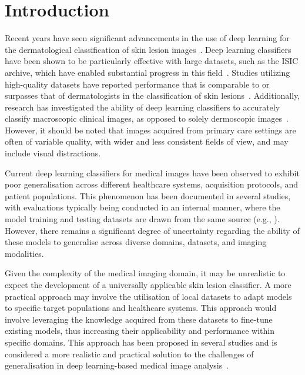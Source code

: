 \section{Introduction}
\label{sec:generalisation_intro}
Recent years have seen significant advancements in the use of deep learning for the dermatological classification of skin lesion images~\citep{du2020ai,wu2022skin}. Deep learning classifiers have been shown to be particularly effective with large datasets, such as the ISIC archive, which have enabled substantial progress in this field~\citep{tschandl2018ham10000,wen2021characteristics}. Studies utilizing high-quality datasets have reported performance that is comparable to or surpasses that of dermatologists in the classification of skin lesions~\citep{esteva2017dermatologist,haenssle2018man,han2018classification,tschandl2019expert}. Additionally, research has investigated the ability of deep learning classifiers to accurately classify macroscopic clinical images, as opposed to solely dermoscopic images~\citep{fujisawa2019deep}. However, it should be noted that images acquired from primary care settings are often of variable quality, with wider and less consistent fields of view, and may include visual distractions.

Current deep learning classifiers for medical images have been observed to exhibit poor generalisation across different healthcare systems, acquisition protocols, and patient populations. This phenomenon has been documented in several studies, with evaluations typically being conducted in an internal manner, where the model training and testing datasets are drawn from the same source (e.g., \cite{han2018classification}). However, there remains a significant degree of uncertainty regarding the ability of these models to generalise across diverse domains, datasets, and imaging modalities. 

Given the complexity of the medical imaging domain, it may be unrealistic to expect the development of a universally applicable skin lesion classifier. A more practical approach may involve the utilisation of local datasets to adapt models to specific target populations and healthcare systems. This approach would involve leveraging the knowledge acquired from these datasets to fine-tune existing models, thus increasing their applicability and performance within specific domains. This approach has been proposed in several studies and is considered a more realistic and practical solution to the challenges of generalisation in deep learning-based medical image analysis~\citep{glocker2022risk}. 

